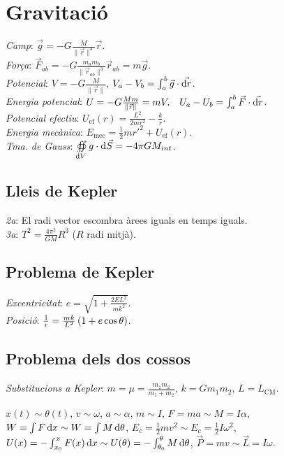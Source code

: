 \section{Gravitació}
\emph{Camp}: $\vec{g} = -G \frac{M}{\|\vec{r}\|^3} \vec{r}$. \\
\emph{Força}: $\vec{F}_{ab} = -G \frac{m_a m_b}{\|\vec{r}_{ab}\|^3} \vec{r}_{ab}=m\vec{g}$. \\
\emph{Potencial}: $V = -G \frac{M}{\|\vec{r}\|}$,  $V_a-V_b = \int_a^b \vec{g} \cdot \vec{\dif r}$. \\
\emph{Energia potencial}: $U = -G \frac{Mm}{\|\vec{r}\|}=mV. \quad U_a-U_b = \int_a^b \vec{F} \cdot \vec{\dif r}$.\\
\emph{Potencial efectiu}: $U_\text{ef}(r) = \frac{L^2}{2mr^2} - \frac{k}{r}$.\\
\emph{Energia mecànica}: $E_{\text{mec}} = \frac{1}{2} mr'^2 + U_\text{ef}(r)$.\\
\emph{Tma. de Gauss}: $\oiint\limits_{\dif V} g \cdot \dif{\vec{S}} = -4\pi GM_{int} $.

\subsection{Lleis de Kepler}
\emph{2a}: El radi vector escombra àrees iguals en temps iguals. \\
\emph{3a}: $T^2=\frac{4\pi^2}{GM}R^3$ ($R$ radi mitjà).

\subsection{Problema de Kepler}
\emph{Excentricitat}: $e = \sqrt{1 + \frac{2EL^2}{mk^2}}$.\\
\emph{Posició}: $\frac{1}{r} = \frac{mk}{L^2} \left( 1 + e \cos \theta \right)$.

\subsection{Problema dels dos cossos}
\emph{Substitucions a Kepler}: $m = \mu = \frac{m_1m_2}{m_1+m_2},\, k = Gm_1m_2, \, L = L_\text{CM}$.

\noindent\makebox[\linewidth]{\rule{\linewidth}{0.5pt}}
{\fontsize{7}{12}\selectfont $x(t) \sim \theta(t)$, $v \sim \omega$, $a \sim \alpha$, $m \sim I$, $F = ma \sim M = I\alpha$, $W = \int F \dif x \sim W = \int M \dif \theta$, $E_c = \frac{1}{2}mv^2 \sim E_c = \frac{1}{2} I\omega^2$, $U(x) = -\int_{x_0}^x F(x) \dif x \sim U(\theta) = -\int_{\theta_0}^\theta M \dif \theta$, $\vec{P} = mv \sim \vec{L} = I\omega$. }

